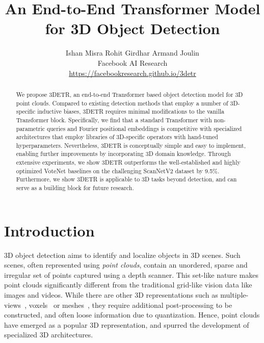 \documentclass[10pt,twocolumn,letterpaper]{article}
\begin{document}
\title{An End-to-End Transformer Model for 3D Object Detection
}

\author{
Ishan Misra \quad \quad Rohit Girdhar \quad \quad Armand Joulin \\
Facebook AI Research \\
{\small \url{https://facebookresearch.github.io/3detr}}
}

\maketitle
\ificcvfinal\thispagestyle{empty}\fi

\begin{abstract}

We propose 3DETR, an end-to-end Transformer based object detection model for 3D point clouds.
Compared to existing detection methods
that employ a number of 3D-specific inductive biases, 3DETR
requires minimal modifications to the vanilla Transformer block. Specifically, we find that a standard Transformer with non-parametric queries and Fourier positional embeddings is competitive with specialized architectures that employ libraries of 3D-specific operators with hand-tuned hyperparameters.
Nevertheless, 3DETR is conceptually simple and easy to implement,
enabling further improvements by incorporating 3D domain knowledge.
Through extensive experiments, we show 3DETR outperforms the well-established and highly optimized VoteNet baselines on the challenging ScanNetV2 dataset by 9.5\%.
Furthermore, we show 3DETR is applicable to 3D tasks beyond detection, and can serve as a building block for future research.







\end{abstract}


\section{Introduction}
\label{sec:intro}


3D object detection aims to identify and localize objects in 3D scenes. Such scenes,  often represented using {\em point clouds}, contain an unordered, sparse and irregular set of points captured using a depth scanner.
This set-like nature makes
point clouds significantly different from the traditional grid-like vision data like images and videos.
While there are other 3D representations such as multiple-views~\cite{su2015multi}, voxels~\cite{adams2010fast} or meshes~\cite{delaunay1934sphere}, they require additional post-processing to be constructed, and often loose information due to quantization.
Hence, point clouds have emerged as a popular 3D representation, and spurred the development of
specialized 3D architectures.
 
\end{document}
